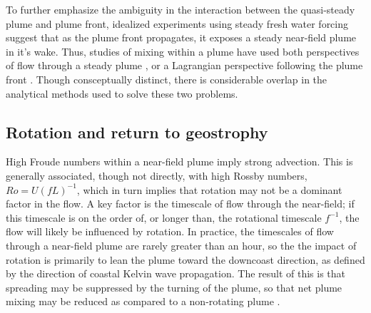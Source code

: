 \documentclass[12pt]{article}
\begin{document}
To further emphasize the ambiguity in the interaction between the quasi-steady plume and plume front, idealized experiments using steady fresh water forcing suggest that as the plume front propagates, it exposes a steady near-field plume in it's wake. Thus, studies of mixing within a plume have used both perspectives of flow through a steady plume \citep{hetland:10a}, or a Lagrangian perspective following the plume front \citep{jay:??}. Though consceptually distinct, there is considerable overlap in the analytical methods used to solve these two problems.

\subsection{Rotation and return to geostrophy}

High Froude numbers within a near-field plume imply strong advection. This is generally associated, though not directly, with high Rossby numbers, $Ro = U (f L)^{-1}$, which in turn implies that rotation may not be a dominant factor in the flow. A key factor is the timescale of flow through the near-field; if this timescale is on the order of, or longer than, the rotational timescale $f^{-1}$, the flow will likely be influenced by rotation. In practice, the timescales of flow through a near-field plume are rarely greater than an hour, so the the impact of rotation is primarily to lean the plume toward the downcoast direction, as defined by the direction of coastal Kelvin wave propagation. The result of this is that spreading may be suppressed by the turning of the plume, so that net plume mixing may be reduced as compared to a non-rotating plume \citep{cole.hetland:16}.






\end{document}
